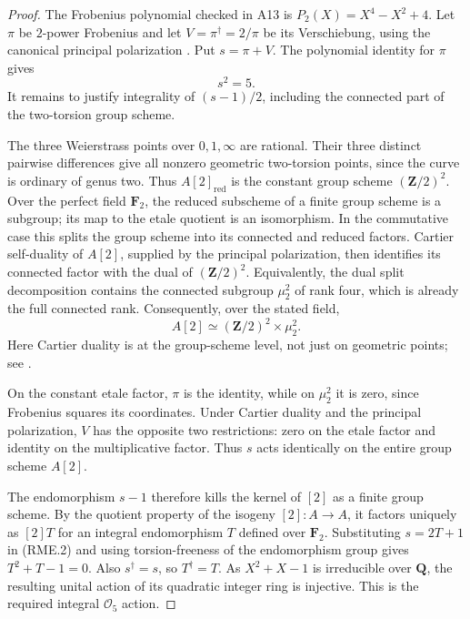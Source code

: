 \documentclass[11pt,a4paper]{article}
\begin{document}
\begin{proof}
The Frobenius polynomial checked in A13 is
$P_2(X)=X^4-X^2+4$. Let $\pi$ be $2$-power Frobenius and
let $V=\pi^\dagger=2/\pi$ be its Verschiebung, using the
canonical principal polarization
\cite[Lemma~19.2]{MilneAV}. Put $s=\pi+V$. The polynomial
identity for $\pi$ gives
\[
                              s^2=5.
 \tag{RME.2}
\]
It remains to justify integrality of $(s-1)/2$, including the
connected part of the two-torsion group scheme.

The three Weierstrass points over $0,1,\infty$ are rational.
Their three distinct pairwise differences give all nonzero
geometric two-torsion points, since the curve is ordinary of
genus two. Thus $A[2]_{\mathrm{red}}$ is the constant group
scheme $(\mathbf Z/2)^2$. Over the perfect field $\mathbf F_2$,
the reduced subscheme of a finite group scheme is a subgroup;
its map to the etale quotient is an isomorphism. In the
commutative case this splits the group scheme into its connected
and reduced factors. Cartier self-duality of $A[2]$, supplied
by the principal polarization, then identifies its connected
factor with the dual of $(\mathbf Z/2)^2$. Equivalently, the
dual split decomposition contains the connected subgroup
$\mu_2^2$ of rank four, which is already the full connected
rank. Consequently, over the stated field,
\[
                       A[2]\simeq(\mathbf Z/2)^2\times\mu_2^2.
 \tag{RME.3}
\]
Here Cartier duality is at the group-scheme level, not just on
geometric points; see \cite[Theorem~11.1 and the opening of
Section~16, pp.~18 and~29]{MilneAV}.

On the constant etale factor, $\pi$ is the identity, while on
$\mu_2^2$ it is zero, since Frobenius squares its coordinates.
Under Cartier duality and the principal polarization, $V$ has
the opposite two restrictions: zero on the etale factor and
identity on the multiplicative factor. Thus $s$ acts identically
on the entire group scheme $A[2]$.

The endomorphism $s-1$ therefore kills the kernel of $[2]$ as
a finite group scheme. By the quotient property of the isogeny
$[2]:A\to A$, it factors uniquely as $[2]T$ for an integral
endomorphism $T$ defined over $\mathbf F_2$. Substituting
$s=2T+1$ in (RME.2) and using torsion-freeness of the
endomorphism group gives $T^2+T-1=0$. Also $s^\dagger=s$, so
$T^\dagger=T$. As $X^2+X-1$ is irreducible over $\mathbf Q$,
the resulting unital action of its quadratic integer ring is
injective. This is the required integral $\mathcal O_5$ action.
\end{proof}
\end{document}
